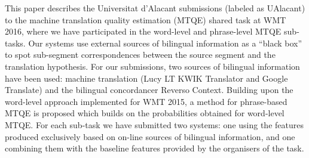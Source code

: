 This paper describes the Universitat d'Alacant submissions (labeled as UAlacant) to the machine translation quality estimation (MTQE) shared task at WMT 2016, where we have participated in the word-level and phrase-level MTQE sub-tasks. Our systems use external sources of bilingual information as a ``black box'' to spot sub-segment correspondences between the source segment and the translation hypothesis. For our submissions, two sources of bilingual information have been used: machine translation (Lucy LT KWIK Translator and Google Translate) and the bilingual concordancer Reverso Context. Building upon the word-level approach implemented for WMT 2015, a method for phrase-based MTQE is proposed which builds on the probabilities obtained for word-level MTQE. For each sub-task we have submitted two systems: one using the features produced exclusively based on on-line sources of bilingual information, and one combining them with the baseline features provided by the organisers of the task.
